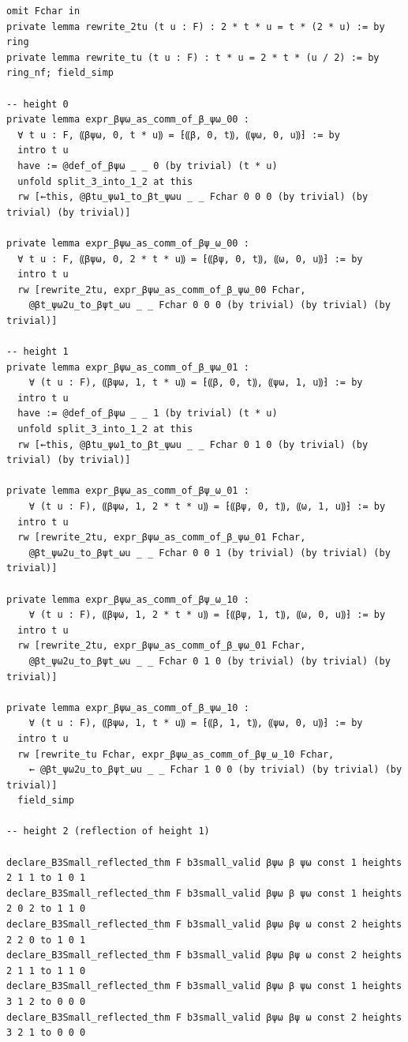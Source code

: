 \documentclass[10pt,a4paper]{article}
\begin{document}
\begin{Verbatim}
omit Fchar in
private lemma rewrite_2tu (t u : F) : 2 * t * u = t * (2 * u) := by ring
private lemma rewrite_tu (t u : F) : t * u = 2 * t * (u / 2) := by ring_nf; field_simp

-- height 0
private lemma expr_βψω_as_comm_of_β_ψω_00 :
  ∀ t u : F, ⸨βψω, 0, t * u⸩ = ⁅⸨β, 0, t⸩, ⸨ψω, 0, u⸩⁆ := by
  intro t u
  have := @def_of_βψω _ _ 0 (by trivial) (t * u)
  unfold split_3_into_1_2 at this
  rw [←this, @βtu_ψω1_to_βt_ψωu _ _ Fchar 0 0 0 (by trivial) (by trivial) (by trivial)]

private lemma expr_βψω_as_comm_of_βψ_ω_00 :
  ∀ t u : F, ⸨βψω, 0, 2 * t * u⸩ = ⁅⸨βψ, 0, t⸩, ⸨ω, 0, u⸩⁆ := by
  intro t u
  rw [rewrite_2tu, expr_βψω_as_comm_of_β_ψω_00 Fchar,
    @βt_ψω2u_to_βψt_ωu _ _ Fchar 0 0 0 (by trivial) (by trivial) (by trivial)]

-- height 1
private lemma expr_βψω_as_comm_of_β_ψω_01 :
    ∀ (t u : F), ⸨βψω, 1, t * u⸩ = ⁅⸨β, 0, t⸩, ⸨ψω, 1, u⸩⁆ := by
  intro t u
  have := @def_of_βψω _ _ 1 (by trivial) (t * u)
  unfold split_3_into_1_2 at this
  rw [←this, @βtu_ψω1_to_βt_ψωu _ _ Fchar 0 1 0 (by trivial) (by trivial) (by trivial)]

private lemma expr_βψω_as_comm_of_βψ_ω_01 :
    ∀ (t u : F), ⸨βψω, 1, 2 * t * u⸩ = ⁅⸨βψ, 0, t⸩, ⸨ω, 1, u⸩⁆ := by
  intro t u
  rw [rewrite_2tu, expr_βψω_as_comm_of_β_ψω_01 Fchar,
    @βt_ψω2u_to_βψt_ωu _ _ Fchar 0 0 1 (by trivial) (by trivial) (by trivial)]

private lemma expr_βψω_as_comm_of_βψ_ω_10 :
    ∀ (t u : F), ⸨βψω, 1, 2 * t * u⸩ = ⁅⸨βψ, 1, t⸩, ⸨ω, 0, u⸩⁆ := by
  intro t u
  rw [rewrite_2tu, expr_βψω_as_comm_of_β_ψω_01 Fchar,
    @βt_ψω2u_to_βψt_ωu _ _ Fchar 0 1 0 (by trivial) (by trivial) (by trivial)]

private lemma expr_βψω_as_comm_of_β_ψω_10 :
    ∀ (t u : F), ⸨βψω, 1, t * u⸩ = ⁅⸨β, 1, t⸩, ⸨ψω, 0, u⸩⁆ := by
  intro t u
  rw [rewrite_tu Fchar, expr_βψω_as_comm_of_βψ_ω_10 Fchar,
    ← @βt_ψω2u_to_βψt_ωu _ _ Fchar 1 0 0 (by trivial) (by trivial) (by trivial)]
  field_simp

-- height 2 (reflection of height 1)

declare_B3Small_reflected_thm F b3small_valid βψω β ψω const 1 heights 2 1 1 to 1 0 1
declare_B3Small_reflected_thm F b3small_valid βψω β ψω const 1 heights 2 0 2 to 1 1 0
declare_B3Small_reflected_thm F b3small_valid βψω βψ ω const 2 heights 2 2 0 to 1 0 1
declare_B3Small_reflected_thm F b3small_valid βψω βψ ω const 2 heights 2 1 1 to 1 1 0
declare_B3Small_reflected_thm F b3small_valid βψω β ψω const 1 heights 3 1 2 to 0 0 0
declare_B3Small_reflected_thm F b3small_valid βψω βψ ω const 2 heights 3 2 1 to 0 0 0


\end{Verbatim}
\end{document}
